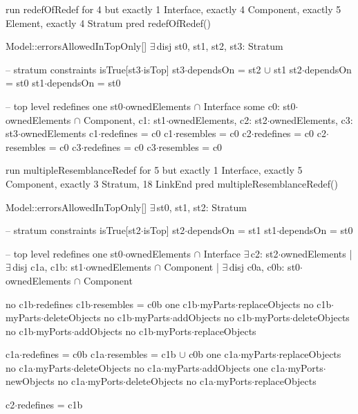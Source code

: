 run redefOfRedef for 4 but exactly 1 Interface, exactly 4 Component, exactly 5 Element, exactly 4 Stratum
pred redefOfRedef()
{
  Model::errorsAllowedInTopOnly[]
  $\exists\,$disj st0, st1, st2, st3: Stratum
  {
    -- stratum constraints
    isTrue[st3$\cdot$isTop]
    st3$\cdot$dependsOn = st2 $\cup$ st1
    st2$\cdot$dependsOn = st0
    st1$\cdot$dependsOn = st0

    -- top level redefines
    one st0$\cdot$ownedElements $\cap$ Interface
    some
      c0: st0$\cdot$ownedElements $\cap$ Component,
      c1: st1$\cdot$ownedElements,
      c2: st2$\cdot$ownedElements,
      c3: st3$\cdot$ownedElements
    {
      c1$\cdot$redefines = c0
      c1$\cdot$resembles = c0
      c2$\cdot$redefines = c0
      c2$\cdot$resembles = c0
      c3$\cdot$redefines = c0
      c3$\cdot$resembles = c0
    }
  }
  
}

run multipleResemblanceRedef for 5 but exactly 1 Interface, exactly 5 Component, exactly 3 Stratum, 18 LinkEnd
pred multipleResemblanceRedef()
{
  Model::errorsAllowedInTopOnly[]
  $\exists\,$st0, st1, st2: Stratum
  {
    -- stratum constraints
    isTrue[st2$\cdot$isTop]
    st2$\cdot$dependsOn = st1
    st1$\cdot$dependsOn = st0

    -- top level redefines
    one st0$\cdot$ownedElements $\cap$ Interface
    $\exists\,$c2: st2$\cdot$ownedElements |
    $\exists\,$disj c1a, c1b: st1$\cdot$ownedElements $\cap$ Component |
    $\exists\,$disj c0a, c0b: st0$\cdot$ownedElements $\cap$ Component
    {
      no c1b$\cdot$redefines
      c1b$\cdot$resembles = c0b
      one c1b$\cdot$myParts$\cdot$replaceObjects
      no c1b$\cdot$myParts$\cdot$deleteObjects
      no c1b$\cdot$myParts$\cdot$addObjects
      no c1b$\cdot$myPorts$\cdot$deleteObjects
      no c1b$\cdot$myPorts$\cdot$addObjects
      no c1b$\cdot$myPorts$\cdot$replaceObjects
      
      c1a$\cdot$redefines = c0b
      c1a$\cdot$resembles = c1b $\cup$ c0b
      one c1a$\cdot$myParts$\cdot$replaceObjects
      no c1a$\cdot$myParts$\cdot$deleteObjects
      no c1a$\cdot$myParts$\cdot$addObjects
      one c1a$\cdot$myPorts$\cdot$newObjects
      no c1a$\cdot$myPorts$\cdot$deleteObjects
      no c1a$\cdot$myPorts$\cdot$replaceObjects

      c2$\cdot$redefines = c1b
    }
  }
}

